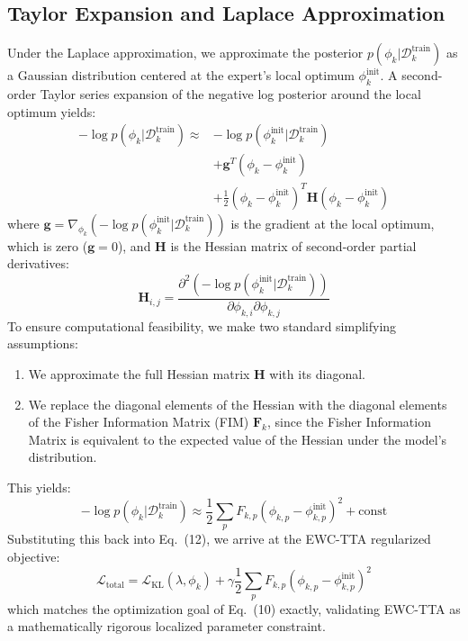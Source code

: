 \documentclass{article}
\theoremstyle{plain}
\theoremstyle{definition}
\theoremstyle{remark}
\begin{document}
\subsection{Taylor Expansion and Laplace Approximation}
Under the Laplace approximation, we approximate the posterior $p(\phi_k | \mathcal{D}_k^{\text{train}})$ as a Gaussian distribution centered at the expert's local optimum $\phi_k^{\text{init}}$. A second-order Taylor series expansion of the negative log posterior around the local optimum yields:
\begin{align}
    -\log p(\phi_k | \mathcal{D}_k^{\text{train}}) \approx &-\log p(\phi_k^{\text{init}} | \mathcal{D}_k^{\text{train}}) \nonumber \\
    &+ \mathbf{g}^T (\phi_k - \phi_k^{\text{init}}) \nonumber \\
    &+ \frac{1}{2} (\phi_k - \phi_k^{\text{init}})^T \mathbf{H} (\phi_k - \phi_k^{\text{init}})
\end{align}
where $\mathbf{g} = \nabla_{\phi_k} (-\log p(\phi_k^{\text{init}} | \mathcal{D}_k^{\text{train}}))$ is the gradient at the local optimum, which is zero ($\mathbf{g} = 0$), and $\mathbf{H}$ is the Hessian matrix of second-order partial derivatives:
\begin{equation}
    \mathbf{H}_{i, j} = \frac{\partial^2 (-\log p(\phi_k^{\text{init}} | \mathcal{D}_k^{\text{train}}))}{\partial \phi_{k, i} \partial \phi_{k, j}}
\end{equation}
To ensure computational feasibility, we make two standard simplifying assumptions:
\begin{enumerate}
    \item We approximate the full Hessian matrix $\mathbf{H}$ with its diagonal.
    \item We replace the diagonal elements of the Hessian with the diagonal elements of the Fisher Information Matrix (FIM) $\mathbf{F}_k$, since the Fisher Information Matrix is equivalent to the expected value of the Hessian under the model's distribution.
\end{enumerate}
This yields:
\begin{equation}
    -\log p(\phi_k | \mathcal{D}_k^{\text{train}}) \approx \frac{1}{2} \sum_p F_{k, p} \left( \phi_{k, p} - \phi_{k, p}^{\text{init}} \right)^2 + \text{const}
\end{equation}
Substituting this back into Eq.~(12), we arrive at the EWC-TTA regularized objective:
\begin{equation}
    \mathcal{L}_{\text{total}} = \mathcal{L}_{\text{KL}}(\lambda, \phi_k) + \gamma \frac{1}{2} \sum_p F_{k, p} \left( \phi_{k, p} - \phi_{k, p}^{\text{init}} \right)^2
\end{equation}
which matches the optimization goal of Eq.~(10) exactly, validating EWC-TTA as a mathematically rigorous localized parameter constraint.
\end{document}
